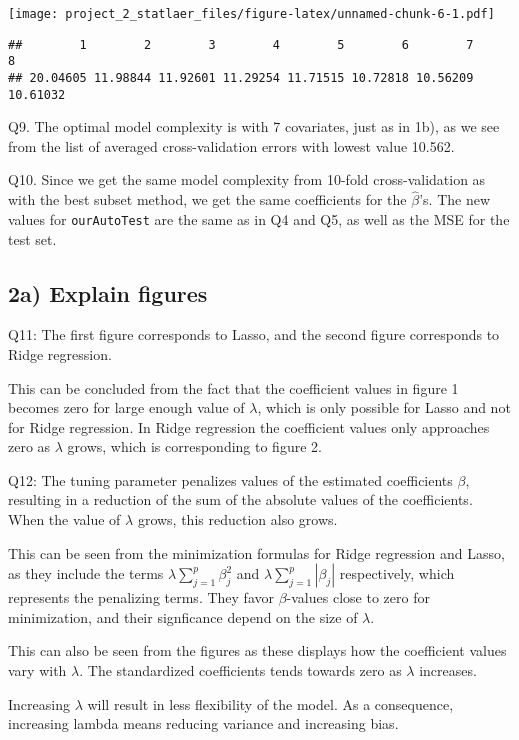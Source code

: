 \documentclass[]{article}
\begin{document}
\texttt{[image: project\_2\_statlaer\_files/figure-latex/unnamed-chunk-6-1.pdf]}

\begin{verbatim}
##        1        2        3        4        5        6        7        8 
## 20.04605 11.98844 11.92601 11.29254 11.71515 10.72818 10.56209 10.61032
\end{verbatim}

Q9. The optimal model complexity is with 7 covariates, just as in 1b),
as we see from the list of averaged cross-validation errors with lowest
value 10.562.

Q10. Since we get the same model complexity from 10-fold
cross-validation as with the best subset method, we get the same
coefficients for the \(\hat\beta\)'s. The new values for
\texttt{ourAutoTest} are the same as in Q4 and Q5, as well as the MSE
for the test set.

\subsection{2a) Explain figures}\label{a-explain-figures}

Q11: The first figure corresponds to Lasso, and the second figure
corresponds to Ridge regression.

This can be concluded from the fact that the coefficient values in
figure 1 becomes zero for large enough value of \(\lambda\), which is
only possible for Lasso and not for Ridge regression. In Ridge
regression the coefficient values only approaches zero as \(\lambda\)
grows, which is corresponding to figure 2.

Q12: The tuning parameter penalizes values of the estimated coefficients
\(\beta\), resulting in a reduction of the sum of the absolute values of
the coefficients. When the value of \(\lambda\) grows, this reduction
also grows.

This can be seen from the minimization formulas for Ridge regression and
Lasso, as they include the terms \(\lambda \sum_{j=1}^p \beta_j^2\) and
\(\lambda \sum_{j=1}^p |\beta_j|\) respectively, which represents the
penalizing terms. They favor \(\beta\)-values close to zero for
minimization, and their signficance depend on the size of \(\lambda\).

This can also be seen from the figures as these displays how the
coefficient values vary with \(\lambda\). The standardized coefficients
tends towards zero as \(\lambda\) increases.

Increasing \(\lambda\) will result in less flexibility of the model. As
a consequence, increasing lambda means reducing variance and increasing
bias.
\end{document}
